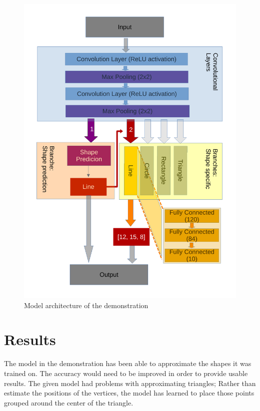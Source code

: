 \documentclass[12pt, a4paper, titlepage]{report}
\begin{document}
\begin{figure}[h]
   \includegraphics[width=1.0\textwidth]{../rc/images/rtov_architecture.pdf}
   \caption{Model architecture of the demonstration \cite{scheme_rtov_architecture}}
   \label{fig:rtov_architecture}
\end{figure}




\chapter{Results}

The model in the demonstration has been able to approximate the shapes it was trained on. The accuracy would need to be improved in order to provide usable results. The given model had problems with approximating triangles; Rather than estimate the positions of the vertices, the model has learned to place those points grouped around the center of the triangle.
\end{document}
